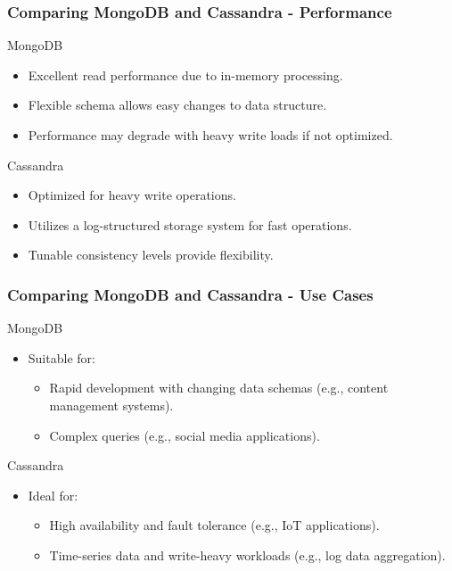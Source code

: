 \documentclass[aspectratio=169]{beamer}
\begin{document}
\begin{frame}[fragile]
    \frametitle{Comparing MongoDB and Cassandra - Performance}
    \begin{block}{MongoDB}
        \begin{itemize}
            \item Excellent read performance due to in-memory processing.
            \item Flexible schema allows easy changes to data structure.
            \item Performance may degrade with heavy write loads if not optimized.
        \end{itemize}
    \end{block}

    \begin{block}{Cassandra}
        \begin{itemize}
            \item Optimized for heavy write operations.
            \item Utilizes a log-structured storage system for fast operations.
            \item Tunable consistency levels provide flexibility.
        \end{itemize}
    \end{block}
\end{frame}

\begin{frame}[fragile]
    \frametitle{Comparing MongoDB and Cassandra - Use Cases}
    \begin{block}{MongoDB}
        \begin{itemize}
            \item Suitable for:
                \begin{itemize}
                    \item Rapid development with changing data schemas (e.g., content management systems).
                    \item Complex queries (e.g., social media applications).
                \end{itemize}
        \end{itemize}
    \end{block}

    \begin{block}{Cassandra}
        \begin{itemize}
            \item Ideal for:
                \begin{itemize}
                    \item High availability and fault tolerance (e.g., IoT applications).
                    \item Time-series data and write-heavy workloads (e.g., log data aggregation).
                \end{itemize}
        \end{itemize}
    \end{block}
\end{frame}
\end{document}
